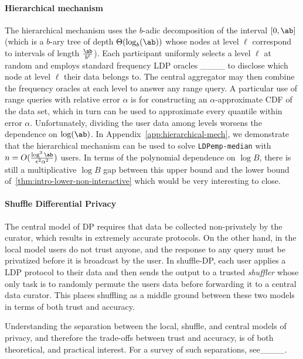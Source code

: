 \paragraph{Hierarchical mechanism} 
%
The hierarchical mechanism uses the $b$-adic decomposition of the interval $[0,\ab]$ (which is a $b$-ary tree of depth $\Theta(\log_b(\ab))$ whose nodes at level $\ell$ correspond to intervals of length $\frac{\ab}{b^\ell}$). Each participant uniformly selects a level $\ell$ at random and employs standard frequency LDP oracles ____ to disclose which node at level $\ell$ their data belongs to. The central aggregator may then combine the frequency oracles at each level to answer any range query. 
%
%
A particular use of range queries with relative error $\alpha$ is for constructing an $\alpha$-approximate CDF of the data set, which in turn can be used to approximate every quantile within error $\alpha$. Unfortunately, dividing the user data among levels worsens the dependence on $\log(\ab)$. In Appendix~\ref{app:hierarchical-mech}, we demonstrate that the hierarchical mechanism can be used to solve \texttt{LDPemp-median} with $n =O(\frac{\log^3 \ab}{\epsilon^2 \alpha^2})$ users. %
%
In terms of the polynomial dependence on $\log B$, there is still a multiplicative $\log B$ gap between this upper bound and the lower bound of~\cref{thm:intro-lower-non-interactive} which would be very interesting to close.

\paragraph{Shuffle Differential Privacy}
The central model of DP requires that data be collected non-privately by the curator, which
results in extremely accurate protocols. %
On the other hand, in the local model users do not trust anyone, and the response to any query must be privatized before it is broadcast by the user. In shuffle-DP, each user applies a LDP protocol to their data and then sends the output to a trusted \emph{shuffler} whose only task is to randomly permute the users data before forwarding it to a central data curator. This places shuffling as a middle ground between these two models in terms of both trust and accuracy. 

%
Understanding the separation between the local, shuffle, and central models of privacy, and therefore the trade-offs between trust and accuracy, is of both theoretical, and practical interest. For a survey of such separations, see____. 

